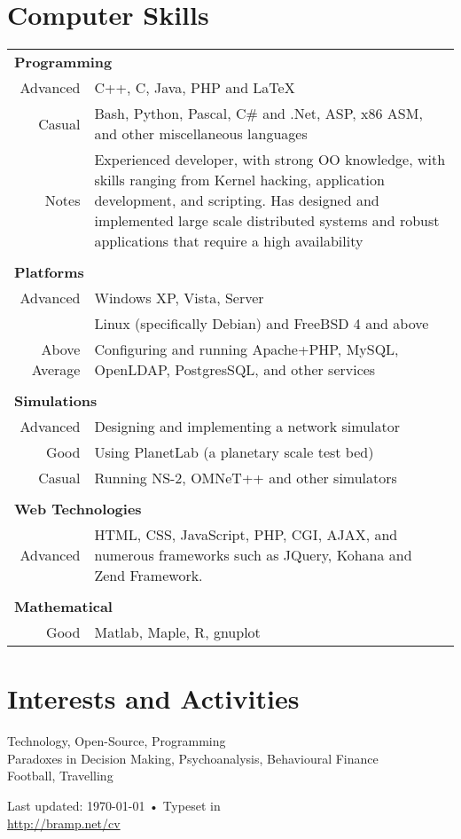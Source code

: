 \documentclass[a4paper,10pt]{article}
\begin{document}
\section{Computer Skills}
\begin{tabular}{rp{12cm}}

\multicolumn{2}{l}{\textbf{Programming}} \\
Advanced & C++, C, Java, PHP and \LaTeX \\
Casual   & Bash, Python, Pascal, C\# and .Net, ASP, x86 ASM, and other miscellaneous languages \\
Notes    & Experienced developer, with strong OO knowledge, with skills ranging from Kernel hacking, application development, and scripting. Has designed and implemented large scale distributed systems and robust applications that require a high availability\\

\\
\multicolumn{2}{l}{\textbf{Platforms}} \\
Advanced       & Windows XP, Vista, Server\\
               & Linux (specifically Debian) and FreeBSD 4 and above\\
Above Average  & Configuring and running Apache+PHP, MySQL, OpenLDAP, PostgresSQL, and other services\\

\\
\multicolumn{2}{l}{\textbf{Simulations}} \\
Advanced & Designing and implementing a network simulator\\
Good     & Using PlanetLab (a planetary scale test bed)\\
Casual   & Running NS-2, OMNeT++ and other simulators\\

\\
\multicolumn{2}{l}{\textbf{Web Technologies}} \\
Advanced & HTML, CSS, JavaScript, PHP, CGI, AJAX, and numerous frameworks such as JQuery, Kohana and Zend Framework.\\

\\
\multicolumn{2}{l}{\textbf{Mathematical}} \\
Good & Matlab, Maple, R, gnuplot\\

\end{tabular}

\section{Interests and Activities}
Technology, Open-Source, Programming\\
Paradoxes in Decision Making, Psychoanalysis, Behavioural Finance\\
Football, Travelling

\vfill{}

\begin{center}
{\scriptsize  Last updated: \today\- •\- 
Typeset in \XeLaTeX\\
\href{http://bramp.net/cv}{http://bramp.net/cv}}
\end{center}
\end{document}
